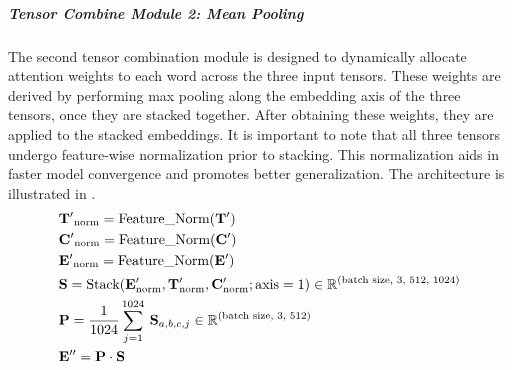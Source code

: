 \subparagraph*{Tensor Combine Module 2: Mean Pooling}
\label{subpar:3_mean_pooling}
The second tensor combination module is designed to dynamically allocate attention weights to each word across the three input tensors. These weights are derived by performing max pooling along the embedding axis of the three tensors, once they are stacked together. After obtaining these weights, they are applied to the stacked embeddings. It is important to note that all three tensors undergo feature-wise normalization prior to stacking. This normalization aids in faster model convergence and promotes better generalization. The architecture is illustrated in .
\begin{equation} \label{eq:3_tensor_combine_linear_1}
    \begin{split}
        &\mathbf{T'}_{\text{norm}} = \text{Feature\_Norm}(\mathbf{T}')\\
        &\mathbf{C'}_{\text{norm}} = \text{Feature\_Norm}(\mathbf{C}')\\
        &\mathbf{E'}_{\text{norm}} = \text{Feature\_Norm}(\mathbf{E}')\\
        &\mathbf{S} = \text{Stack}(\mathbf{E}'_{\text{norm}}, \mathbf{T}'_{\text{norm}}, \mathbf{C}'_{\text{norm}}; \text{axis} = 1)\in \mathbb{R}^{{\small(\text{batch size, 3, 512, 1024})}}\\
        &\mathbf{P} = \frac{1}{1024}\sum_{j = 1}^{1024}\:\mathbf{S}_{a,b,c,j}\in \mathbb{R}^{{\small(\text{batch size, 3, 512})}}\\
        &\mathbf{E}'' = \mathbf{P}\cdot \mathbf{S}
    \end{split}
\end{equation}


